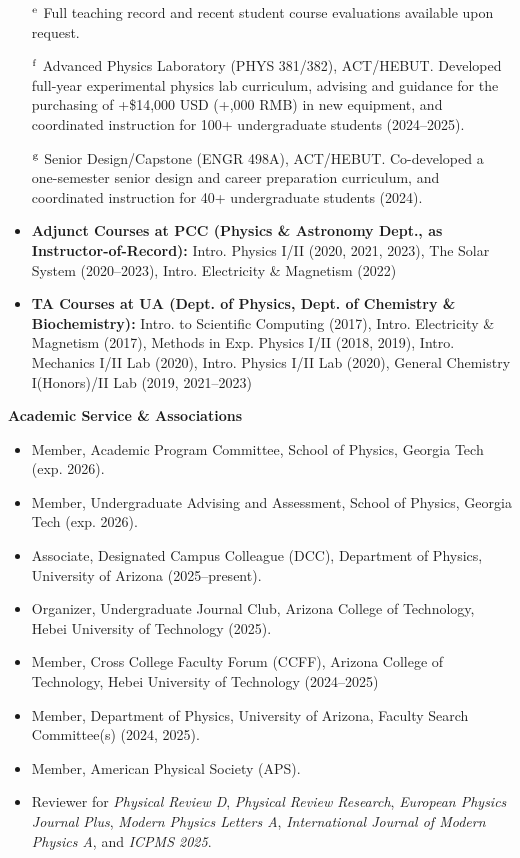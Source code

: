 \documentclass[11pt]{article}
\begin{document}
\begin{itemize}[leftmargin=*,nosep]
    \item[\(^{\rm e}\)] Full teaching record and recent student course evaluations available upon request.
    \item[\(^{\rm f}\)] Advanced Physics Laboratory (PHYS 381/382), ACT/HEBUT. Developed full-year experimental physics lab curriculum, advising and guidance for the purchasing of +\$14,000 USD (+,000 RMB) in new equipment, and coordinated instruction for 100+ undergraduate students (2024--2025).
    \item[\(^{\rm g}\)] Senior Design/Capstone (ENGR 498A), ACT/HEBUT. Co-developed a one-semester senior design and career preparation curriculum, and coordinated instruction for 40+ undergraduate students (2024).
\end{itemize}

\begin{itemize}[leftmargin=*,nosep]
    \item \textbf{Adjunct Courses at PCC (Physics \& Astronomy Dept., as Instructor-of-Record):} Intro. Physics I/II (2020, 2021, 2023), The Solar System (2020--2023), Intro. Electricity \& Magnetism (2022)
    \item \textbf{TA Courses at UA (Dept. of Physics, Dept. of Chemistry \& Biochemistry):} Intro. to Scientific Computing (2017), Intro. Electricity \& Magnetism (2017), Methods in Exp. Physics I/II (2018, 2019), Intro. Mechanics I/II Lab (2020), Intro. Physics I/II Lab (2020), General Chemistry I(Honors)/II Lab (2019, 2021--2023)
\end{itemize}

\medskip

{\Large\textbf{Academic Service \& Associations}}

\begin{itemize}[leftmargin=*,nosep]
    \item Member, Academic Program Committee, School of Physics, Georgia Tech (exp. 2026).
    \item Member, Undergraduate Advising and Assessment, School of Physics, Georgia Tech (exp. 2026).
    \item Associate, Designated Campus Colleague (DCC), Department of Physics, University of Arizona (2025--present).
    \item Organizer, Undergraduate Journal Club, Arizona College of Technology, Hebei University of Technology (2025).
    \item Member, Cross College Faculty Forum (CCFF), Arizona College of Technology, Hebei University of Technology (2024--2025)
    \item Member, Department of Physics, University of Arizona, Faculty Search Committee(s) (2024, 2025).
    \item Member, American Physical Society (APS).
    \item Reviewer for \textit{Physical Review D}, \textit{Physical Review Research}, \textit{European Physics Journal Plus}, \textit{Modern Physics Letters A}, \textit{International Journal of Modern Physics A}, and \textit{ICPMS 2025}.
\end{itemize}
\end{document}

